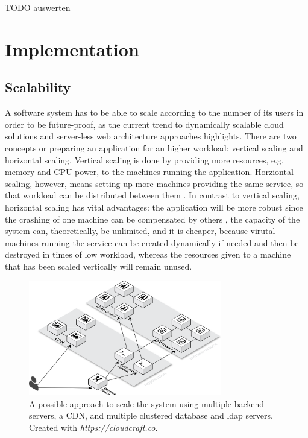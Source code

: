 TODO auswerten



\section{Implementation}
\subsection{Scalability}
\label{scale}
A software system has to be able to scale according to the number of its users in order to be future-proof, as the current trend to dynamically scalable cloud solutions and server-less web architecture approaches highlights. There are two concepts or preparing an application for an higher workload: vertical scaling and horizontal scaling. Vertical scaling is done by providing more resources, e.g. memory and CPU power, to the machines running the application. Horziontal scaling, however, means setting up more machines providing the same service, so that workload can be distributed between them \cite{hvscale}. In contrast to vertical scaling, horizontal scaling has vital advantages: the application will be more robust since the crashing of one machine can be compensated by others \cite{fedi}, the capacity of the system can, theoretically, be unlimited, and it is cheaper, because virutal machines running the service can be created dynamically if needed and then be destroyed in times of low workload, whereas the resources given to a machine that has been scaled vertically will remain unused.

\begin{figure}[!htp]
    \centering
    \includegraphics[width=0.75\textwidth]{images/system_architecture_scaled.png}
    \caption[System Architecture (scaled up)]{A possible approach to scale the system using multiple backend servers, a CDN, and multiple clustered database and ldap servers. Created with \textit{https://cloudcraft.co}.}
    \label{scaleup}
\end{figure}

